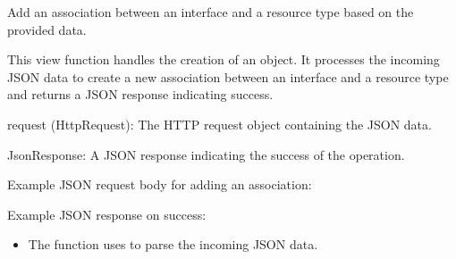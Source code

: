 \documentclass[letterpaper,10pt,english]{sphinxmanual}
\begin{document}
\begin{fulllineitems}
\label{\detokenize{app:app.views.associate}}
\pysigstartsignatures
{}
\pysigstopsignatures
\sphinxAtStartPar
Add an association between an interface and a resource type based on the provided data.

\sphinxAtStartPar
This view function handles the creation of an  object. 
It processes the incoming JSON data to create a new association between an interface 
and a resource type and returns a JSON response indicating success.
\begin{description}
\sphinxAtStartPar
request (HttpRequest): The HTTP request object containing the JSON data.

\sphinxAtStartPar
JsonResponse: A JSON response indicating the success of the operation.

\sphinxAtStartPar
Example JSON request body for adding an association:

\begin{sphinxVerbatim}[commandchars=\\\{\}]
\end{sphinxVerbatim}

\sphinxAtStartPar
Example JSON response on success:

\begin{sphinxVerbatim}[commandchars=\\\{\}]
\end{sphinxVerbatim}

\begin{itemize}
\item {} 
\sphinxAtStartPar
The function uses  to parse the incoming JSON data.


\end{itemize}
\end{description}
\end{fulllineitems}
\end{document}
